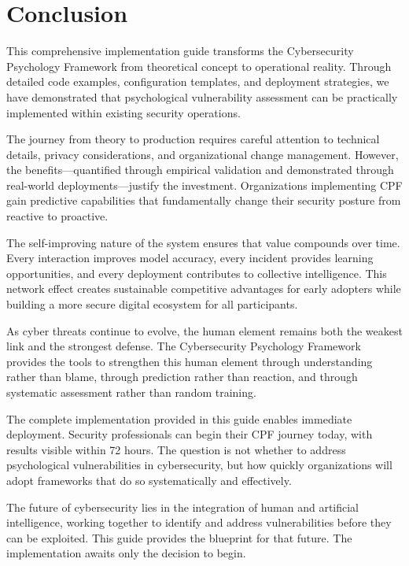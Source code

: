 \documentclass[11pt,a4paper]{article}
\begin{document}
\section{Conclusion}

This comprehensive implementation guide transforms the Cybersecurity Psychology Framework from theoretical concept to operational reality. Through detailed code examples, configuration templates, and deployment strategies, we have demonstrated that psychological vulnerability assessment can be practically implemented within existing security operations.

The journey from theory to production requires careful attention to technical details, privacy considerations, and organizational change management. However, the benefits—quantified through empirical validation and demonstrated through real-world deployments—justify the investment. Organizations implementing CPF gain predictive capabilities that fundamentally change their security posture from reactive to proactive.

The self-improving nature of the system ensures that value compounds over time. Every interaction improves model accuracy, every incident provides learning opportunities, and every deployment contributes to collective intelligence. This network effect creates sustainable competitive advantages for early adopters while building a more secure digital ecosystem for all participants.

As cyber threats continue to evolve, the human element remains both the weakest link and the strongest defense. The Cybersecurity Psychology Framework provides the tools to strengthen this human element through understanding rather than blame, through prediction rather than reaction, and through systematic assessment rather than random training.

The complete implementation provided in this guide enables immediate deployment. Security professionals can begin their CPF journey today, with results visible within 72 hours. The question is not whether to address psychological vulnerabilities in cybersecurity, but how quickly organizations will adopt frameworks that do so systematically and effectively.

The future of cybersecurity lies in the integration of human and artificial intelligence, working together to identify and address vulnerabilities before they can be exploited. This guide provides the blueprint for that future. The implementation awaits only the decision to begin.
\end{document}
